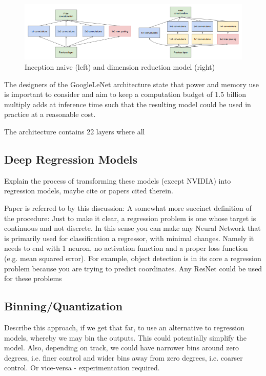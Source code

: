 \begin{figure}[ht]
 \centering 
 \includegraphics[width=\columnwidth]{Figures/InceptionModules.png}
 \caption{Inception naive (left) and dimension reduction model (right)}
 \label{fig:inception_modules}
\end{figure}

The designers of the GoogleLeNet architecture state that power and memory use is important to consider and aim to keep a computation budget of 1.5 billion multiply adds at inference time such that the resulting model could be used in practice at a reasonable cost.

The architecture contains 22 layers where all

\subsection{Deep Regression Models}
Explain the process of transforming these models (except NVIDIA) into regression models, maybe cite \cite{lathuilire2018comprehensive} or papers cited therein.

Paper is referred to by this discussion: 
A somewhat more succinct definition of the procedure:  
Just to make it clear, a regression problem is one whose target is continuous and not discrete. In this sense you can make any Neural Network that is primarily used for classification a regressor, with minimal changes. Namely it needs to end with 1 neuron, no activation function and a proper loss function (e.g. mean squared error). For example, object detection is in its core a regression problem because you are trying to predict coordinates. Any ResNet could be used for these problems

\subsection{Binning/Quantization}
Describe this approach, if we get that far, to use an alternative to regression models, whereby we may bin the outputs. This could potentially simplify the model. Also, depending on track, we could have narrower bins around zero degrees, i.e. finer control and wider bins away from zero degrees, i.e. coarser control. Or vice-versa - experimentation required.

